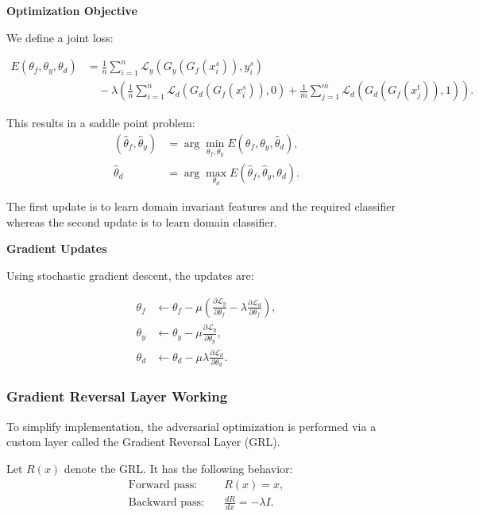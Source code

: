 \documentclass{article}
\begin{document}
\textbf{Optimization Objective}

We define a joint loss:

\begin{align}
E(\theta_f, \theta_y, \theta_d) &= \frac{1}{n} \sum_{i=1}^{n} \mathcal{L}_y(G_y(G_f(x_i^s)), y_i^s) \nonumber \\
&\quad - \lambda \left( \frac{1}{n} \sum_{i=1}^{n} \mathcal{L}_d(G_d(G_f(x_i^s)), 0) + \frac{1}{m} \sum_{j=1}^{m} \mathcal{L}_d(G_d(G_f(x_j^t)), 1) \right).
\label{eq:objective}
\end{align}

This results in a saddle point problem:
\begin{align}
(\hat{\theta}_f, \hat{\theta}_y) &= \arg \min_{\theta_f, \theta_y} E(\theta_f, \theta_y, \hat{\theta}_d), \\
\hat{\theta}_d &= \arg \max_{\theta_d} E(\hat{\theta}_f, \hat{\theta}_y, \theta_d).
\end{align}

The first update is to learn domain invariant features and the required classifier whereas the second update is to learn domain classifier.

\textbf{Gradient Updates}

Using stochastic gradient descent, the updates are:

\begin{align}
\theta_f &\leftarrow \theta_f - \mu \left( \frac{\partial \mathcal{L}_y}{\partial \theta_f} - \lambda \frac{\partial \mathcal{L}_d}{\partial \theta_f} \right), \\
\theta_y &\leftarrow \theta_y - \mu \frac{\partial \mathcal{L}_y}{\partial \theta_y}, \\
\theta_d &\leftarrow \theta_d - \mu \lambda \frac{\partial \mathcal{L}_d}{\partial \theta_d}.
\end{align}

\subsubsection{Gradient Reversal Layer Working}

To simplify implementation, the adversarial optimization is performed via a custom layer called the Gradient Reversal Layer (GRL).


Let \( R(x) \) denote the GRL. It has the following behavior:
\begin{align}
\text{Forward pass:} \quad &R(x) = x, \\
\text{Backward pass:} \quad &\frac{dR}{dx} = -\lambda I.
\end{align}
\end{document}
